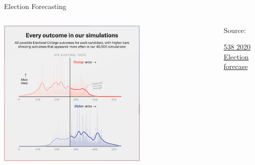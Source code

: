 \documentclass[aspectratio=169,t,11pt,table]{beamer}
\begin{document}
\begin{frame}{Election Forecasting}
  \begin{columns}[T]
    \begin{column}{.7\textwidth}\vspace*{-\bigskipamount}
      \begin{center}
        \includegraphics[width = 0.65\textwidth]{figures/538_3.png}
      \end{center}
    \end{column}
    \begin{column}{.3\textwidth}
      Source:

      \href{https://projects.fivethirtyeight.com/2020-election-forecast/}{538 2020 Election forecase}
    \end{column}
  \end{columns}
\end{frame}
\end{document}
